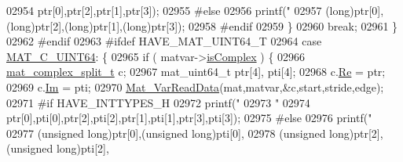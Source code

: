 \begin{DoxyCode}
{{{{{{{{{{{{{{{{{{{{{{{{{02954                             ptr[0],ptr[2],ptr[1],ptr[3]);
02955 \textcolor{preprocessor}{#else}
02956                         printf(\textcolor{stringliteral}{"%
02957                             (\textcolor{keywordtype}{long})ptr[0],(\textcolor{keywordtype}{long})ptr[2],(\textcolor{keywordtype}{long})ptr[1],(\textcolor{keywordtype}{long})ptr[3]);
02958 \textcolor{preprocessor}{#endif}
02959                     \}
02960                     \textcolor{keywordflow}{break};
02961                 \}
02962 \textcolor{preprocessor}{#endif}
02963 \textcolor{preprocessor}{#ifdef HAVE\_MAT\_UINT64\_T}
02964                 \textcolor{keywordflow}{case} \hyperlink{group___m_a_t_ggad4d60ae7b709fc81bfd744fb4c857c40a86470e25c3763d9a24623f04326195dd}{MAT\_C\_UINT64}: \{
02965                     \textcolor{keywordflow}{if} ( matvar->\hyperlink{group___m_a_t_aeb03b3a69f108dc05470b00443a43739}{isComplex} ) \{
02966                         \hyperlink{group___m_a_t_structmat__complex__split__t}{mat\_complex\_split\_t} c;
02967                         mat\_uint64\_t ptr[4], pti[4];
02968                         c.\hyperlink{group___m_a_t_a484a93607508adac2bce53a0252e0325}{Re} = ptr;
02969                         c.\hyperlink{group___m_a_t_a7182d10b0d3598415887376065440946}{Im} = pti;
02970                         \hyperlink{group___m_a_t_ga1845000f4fc6252ec5ff11c4b9f0759f}{Mat\_VarReadData}(mat,matvar,&c,start,stride,edge);
02971 \textcolor{preprocessor}{#if HAVE\_INTTYPES\_H}
02972                         printf(\textcolor{stringliteral}{"%
02973                             \textcolor{stringliteral}{"%
02974                             ptr[0],pti[0],ptr[2],pti[2],ptr[1],pti[1],ptr[3],pti[3]);
02975 \textcolor{preprocessor}{#else}
02976                         printf(\textcolor{stringliteral}{"%
02977                             (\textcolor{keywordtype}{unsigned} \textcolor{keywordtype}{long})ptr[0],(\textcolor{keywordtype}{unsigned} \textcolor{keywordtype}{long})pti[0],
02978                             (\textcolor{keywordtype}{unsigned} \textcolor{keywordtype}{long})ptr[2],(\textcolor{keywordtype}{unsigned} \textcolor{keywordtype}{long})pti[2],
}}}}}}}}}}}}}}}}}}}}}}}}}}}}}
\end{DoxyCode}
